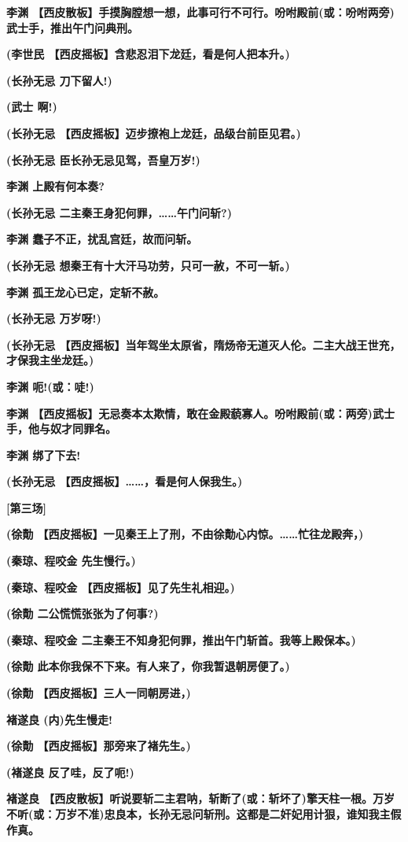 \textbf{李渊
【西皮散板】手摸胸膛想一想，此事可行不可行。吩咐殿前(或：吩咐两旁)武士手，推出午门问典刑。}

\textbf{(李世民 【西皮摇板】含悲忍泪下龙廷，看是何人把本升。)}

\textbf{(长孙无忌 刀下留人!)}

\textbf{(武士 啊!)}

\textbf{(长孙无忌 【西皮摇板】迈步撩袍上龙廷，品级台前臣见君。)}

\textbf{(长孙无忌 臣长孙无忌见驾，吾皇万岁!)}

\textbf{李渊 上殿有何本奏?}

\textbf{(长孙无忌 二主秦王身犯何罪，\ldots{}\ldots{}午门问斩?)}

\textbf{李渊 蠢子不正，扰乱宫廷，故而问斩。}

\textbf{(长孙无忌 想秦王有十大汗马功劳，只可一赦，不可一斩。)}

\textbf{李渊 孤王龙心已定，定斩不赦。}

\textbf{(长孙无忌 万岁呀!)}

\textbf{(长孙无忌
【西皮摇板】当年驾坐太原省，隋炀帝无道灭人伦。二主大战王世充，才保我主坐龙廷。)}

\textbf{李渊 呃!(或：唗!)}

\textbf{李渊
【西皮摇板】无忌奏本太欺情，敢在金殿藐寡人。吩咐殿前(或：两旁)武士手，他与奴才同罪名。}

\textbf{李渊 绑了下去!}

\textbf{(长孙无忌 【西皮摇板】\ldots{}\ldots{}，看是何人保我生。)}

\textbf{{[}第三场{]}}

\textbf{(徐勣
【西皮摇板】一见秦王上了刑，不由徐勣心内惊。\ldots{}\ldots{}忙往龙殿奔，)}

\textbf{(秦琼、程咬金 先生慢行。)}

\textbf{(秦琼、程咬金 【西皮摇板】见了先生礼相迎。)}

\textbf{(徐勣 二公慌慌张张为了何事?)}

\textbf{(秦琼、程咬金
二主秦王不知身犯何罪，推出午门斩首。我等上殿保本。)}

\textbf{(徐勣 此本你我保不下来。有人来了，你我暂退朝房便了。)}

\textbf{(徐勣 【西皮摇板】三人一同朝房进，)}

\textbf{褚遂良 (内)先生慢走!}

\textbf{(徐勣 【西皮摇板】那旁来了褚先生。)}

\textbf{(褚遂良 反了哇，反了呃!)}

\textbf{褚遂良
【西皮散板】听说要斩二主君呐，斩断了(或：斩坏了)擎天柱一根。万岁不听(或：万岁不准)忠良本，长孙无忌问斩刑。这都是二奸妃用计狠，谁知我主假作真。}

